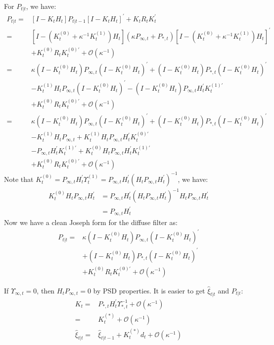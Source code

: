 \documentclass[10pt]{article}
\numberwithin{equation}{section}
\begin{document}
For $P_{t|t}$, we have:
\begin{align*}
    P_{t|t} =& [I-K_tH_t]P_{t|t-1}[I-K_tH_t]^{'}+K_tR_tK_t^{'} \\
    =& [I-(K_t^{(0)}+\kappa^{-1}K_t^{(1)})H_t](\kappa P_{\infty,t}+P_{*,t})[I-(K_t^{(0)}+\kappa^{-1}K_t^{(1)})H_t]^{'} \\ 
    &+ K_t^{(0)}R_tK_t^{(0)'} + \mathcal{O}(\kappa^{-1}) \\
    =& \kappa(I-K_t^{(0)}H_t)P_{\infty,t}(I-K_t^{(0)}H_t)^{'} + (I-K_t^{(0)}H_t)P_{*,t}(I-K_t^{(0)}H_t)^{'} \\
    &-K_t^{(1)}H_tP_{\infty,t}(I-K_t^{(0)}H_t)^{'} - (I-K_t^{(0)}H_t)P_{\infty,t}H_t^{'}K_t^{(1)'} \\
    &+ K_t^{(0)}R_tK_t^{(0)'} + \mathcal{O}(\kappa^{-1}) \\
    =& \kappa(I-K_t^{(0)}H_t)P_{\infty,t}(I-K_t^{(0)}H_t)^{'} + (I-K_t^{(0)}H_t)P_{*,t}(I-K_t^{(0)}H_t)^{'} \\
    &-K_t^{(1)}H_tP_{\infty,t} + K_t^{(1)}H_tP_{\infty,t}H_t^{'}K_t^{(0)'} \\
    &- P_{\infty,t}H_t^{'}K_t^{(1)'} + K_t^{(0)}H_tP_{\infty,t}H_t^{'}K_t^{(1)'}  \\
    &+ K_t^{(0)}R_tK_t^{(0)'} + \mathcal{O}(\kappa^{-1}) 
\end{align*}
Note that $K_t^{(0)} = P_{\infty,t}H_t^{'}\Upsilon_t^{(1)} = P_{\infty,t}H_t^{'}(H_tP_{\infty,t}H_t^{'})^{-1}$, we have:
\begin{align*}
    K_t^{(0)}H_tP_{\infty,t}H_t^{'} &= P_{\infty,t}H_t^{'}(H_tP_{\infty,t}H_t^{'})^{-1}H_tP_{\infty,t}H_t^{'} \\
    &= P_{\infty,t}H_t^{'}
\end{align*}
Now we have a clean Joseph form for the diffuse filter as:
\begin{align}
    P_{t|t}=& \kappa (I-K_t^{(0)}H_t)P_{\infty,t}(I-K_t^{(0)}H_t)^{'} \label{eq:diff_P1} \\
    &+(I-K_t^{(0)}H_t)P_{*,t}(I-K_t^{(0)}H_t)^{'} \nonumber \\
    &+K_t^{(0)}R_tK_t^{(0)'} + \mathcal{O}(\kappa^{-1}) \nonumber
\end{align}

If $\Upsilon_{\infty,t}=0$, then $H_tP_{\infty,t}=0$ by PSD properties. It is easier to get $\hat{\xi}_{t|t}$ and $P_{t|t}$:
\begin{align}
    K_t =& P_{*,t}H_t^{'}\Upsilon_{*,t}^{-1} + \mathcal{O}(\kappa^{-1}) \nonumber \\
    =& K_t^{(*)} + \mathcal{O}(\kappa^{-1}) \label{eq:K2_diffuse} \\
    \hat{\xi}_{t|t} =& \hat{\xi}_{t|t-1} + K_t^{(*)}d_t + \mathcal{O}(\kappa^{-1}) \label{eq:diff_xi2} 
\end{align}
\end{document}

